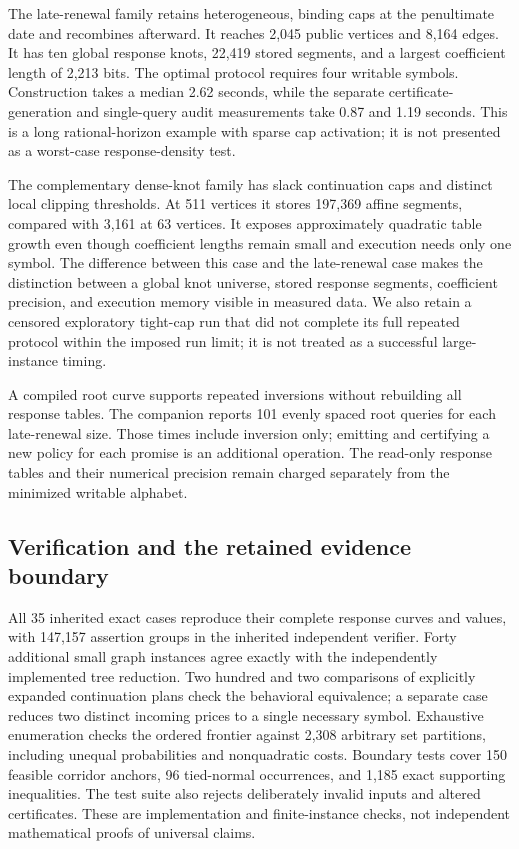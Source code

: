 The late-renewal family retains heterogeneous, binding caps at the penultimate date and recombines afterward. It reaches 2,045 public vertices and 8,164 edges. It has ten global response knots, 22,419 stored segments, and a largest coefficient length of 2,213 bits. The optimal protocol requires four writable symbols. Construction takes a median 2.62 seconds, while the separate certificate-generation and single-query audit measurements take 0.87 and 1.19 seconds. This is a long rational-horizon example with sparse cap activation; it is not presented as a worst-case response-density test.

The complementary dense-knot family has slack continuation caps and distinct local clipping thresholds. At 511 vertices it stores 197,369 affine segments, compared with 3,161 at 63 vertices. It exposes approximately quadratic table growth even though coefficient lengths remain small and execution needs only one symbol. The difference between this case and the late-renewal case makes the distinction between a global knot universe, stored response segments, coefficient precision, and execution memory visible in measured data. We also retain a censored exploratory tight-cap run that did not complete its full repeated protocol within the imposed run limit; it is not treated as a successful large-instance timing.

A compiled root curve supports repeated inversions without rebuilding all response tables. The companion reports 101 evenly spaced root queries for each late-renewal size. Those times include inversion only; emitting and certifying a new policy for each promise is an additional operation. The read-only response tables and their numerical precision remain charged separately from the minimized writable alphabet.

\subsection{Verification and the retained evidence boundary}
All 35 inherited exact cases reproduce their complete response curves and values, with 147,157 assertion groups in the inherited independent verifier. Forty additional small graph instances agree exactly with the independently implemented tree reduction. Two hundred and two comparisons of explicitly expanded continuation plans check the behavioral equivalence; a separate case reduces two distinct incoming prices to a single necessary symbol. Exhaustive enumeration checks the ordered frontier against 2,308 arbitrary set partitions, including unequal probabilities and nonquadratic costs. Boundary tests cover 150 feasible corridor anchors, 96 tied-normal occurrences, and 1,185 exact supporting inequalities. The test suite also rejects deliberately invalid inputs and altered certificates. These are implementation and finite-instance checks, not independent mathematical proofs of universal claims.

